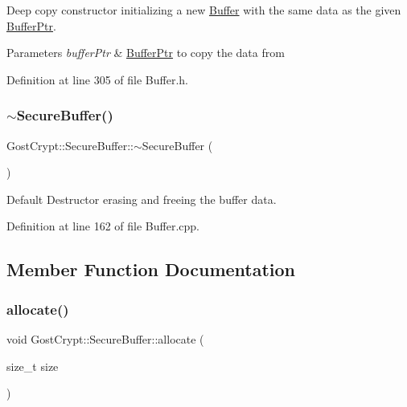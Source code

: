 Deep copy constructor initializing a new \hyperlink{class_gost_crypt_1_1_buffer}{Buffer} with the same data as the given \hyperlink{class_gost_crypt_1_1_buffer_ptr}{Buffer\+Ptr}. 


\begin{DoxyParams}{Parameters}
{\em buffer\+Ptr} & \hyperlink{class_gost_crypt_1_1_buffer_ptr}{Buffer\+Ptr} to copy the data from \\
\hline
\end{DoxyParams}


Definition at line 305 of file Buffer.\+h.

\mbox{\label{class_gost_crypt_1_1_secure_buffer_aad073740f34b317eb77a57c841919a60}} 
\subsubsection{\texorpdfstring{$\sim$\+Secure\+Buffer()}{~SecureBuffer()}}
{\footnotesize\ttfamily Gost\+Crypt\+::\+Secure\+Buffer\+::$\sim$\+Secure\+Buffer (\begin{DoxyParamCaption}{ }\end{DoxyParamCaption})\hspace{0.3cm}{\ttfamily [virtual]}}



Default Destructor erasing and freeing the buffer data. 



Definition at line 162 of file Buffer.\+cpp.



\subsection{Member Function Documentation}
\mbox{\label{class_gost_crypt_1_1_secure_buffer_a832c1af234c29e1dc1521fed24d3265a}} 
\subsubsection{\texorpdfstring{allocate()}{allocate()}}
{\footnotesize\ttfamily void Gost\+Crypt\+::\+Secure\+Buffer\+::allocate (\begin{DoxyParamCaption}\item[{size\+\_\+t}]{size }\end{DoxyParamCaption})\hspace{0.3cm}{\ttfamily [virtual]}}



